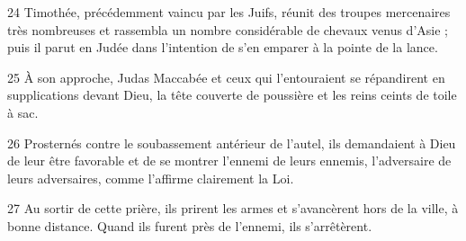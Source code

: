 24 Timothée, précédemment vaincu par les Juifs, réunit des troupes mercenaires très nombreuses et rassembla un nombre considérable de chevaux venus d’Asie ; puis il parut en Judée dans l’intention de s’en emparer à la pointe de la lance.

25 À son approche, Judas Maccabée et ceux qui l’entouraient se répandirent en supplications devant Dieu, la tête couverte de poussière et les reins ceints de toile à sac.

26 Prosternés contre le soubassement antérieur de l’autel, ils demandaient à Dieu de leur être favorable et de se montrer l’ennemi de leurs ennemis, l’adversaire de leurs adversaires, comme l’affirme clairement la Loi.

27 Au sortir de cette prière, ils prirent les armes et s’avancèrent hors de la ville, à bonne distance. Quand ils furent près de l’ennemi, ils s’arrêtèrent.
